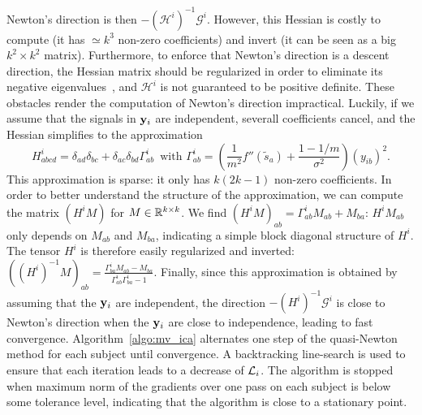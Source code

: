 \documentclass{report}
\begin{document}
Newton's direction is then $-\left(\mathcal{H}^i\right)^{-1}\mathcal{G}^i$. However, this Hessian is costly to compute (it has $\simeq k^3$ non-zero coefficients) and invert (it can be seen as a big $k ^2\times k^2$ matrix). Furthermore, to enforce that Newton's direction is a descent direction, the Hessian matrix should be regularized in order to eliminate its negative eigenvalues~\cite{nocedal2006numerical}, and $\mathcal{H}^i$ is not guaranteed to be positive definite.
%
These obstacles render the computation of Newton's direction impractical.
%
Luckily, if we assume that the signals in $\mathbf{y}_i$ are independent, severall coefficients cancel, and the Hessian simplifies to the approximation
\begin{equation}
    \label{eq:hessian_approx}
    H^i_{abcd} = \delta_{ad}\delta_{bc} + \delta_{ac}\delta_{bd}\Gamma^i_{ab}\enspace \text{with  }\Gamma^i_{ab} = \left(\frac{1}{m^2}f''(\tilde{s}_a) + \frac{1 - 1/m}{\sigma^2}\right)\left(y_{ib}\right)^2.
\end{equation}
This approximation is sparse: it only has $k(2k -1)$ non-zero coefficients.
%
In order to better understand the structure of the approximation, we can compute the matrix $\left(H^iM\right)$ for $M\in \mathbb{R}^{k\times k}$. 
%
We find $\left(H^iM\right)_{ab} = \Gamma^i_{ab}M_{ab} + M_{ba}$: $H^iM_{ab}$ only depends on $M_{ab}$ and $M_{ba}$, indicating a simple block diagonal structure of $H^i$.
%
The tensor $H^i$ is therefore easily regularized and inverted:
$\left((H^i)^{-1}M\right)_{ab} = \frac{\Gamma^i_{ba}M_{ab} - M_{ba}}{\Gamma^i_{ab}\Gamma^i_{ba} - 1}$.
%
Finally, since this approximation is obtained by assuming that the $\mathbf{y}_i$ are independent, the direction $-\left(H^i\right)^{-1}\mathcal{G}^i$ is close to Newton's direction when the $\mathbf{y}_i$ are close to independence, leading to fast convergence.
%
Algorithm~\ref{algo:mv_ica} alternates one step of the quasi-Newton method for each subject until convergence.
%
A backtracking line-search is used to ensure that each iteration leads to a decrease of $\mathcal{L}_i$.
%
The algorithm is stopped when maximum norm of the gradients over one pass on each subject is below some tolerance level, indicating that the algorithm is close to a stationary point.
\end{document}
